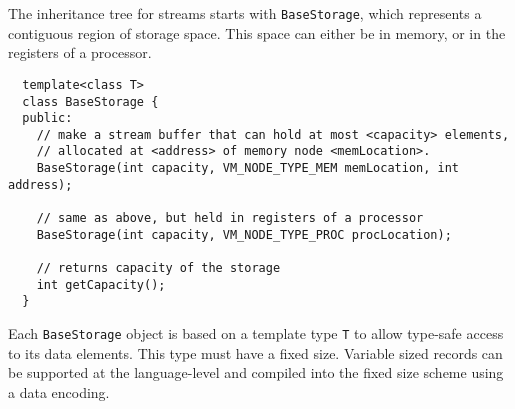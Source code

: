 

The inheritance tree for streams starts with {\tt BaseStorage}, which
represents a contiguous region of storage space.  This space can
either be in memory, or in the registers of a processor.  {\small
\begin{verbatim}
  template<class T>
  class BaseStorage {
  public:
    // make a stream buffer that can hold at most <capacity> elements,
    // allocated at <address> of memory node <memLocation>.
    BaseStorage(int capacity, VM_NODE_TYPE_MEM memLocation, int address);

    // same as above, but held in registers of a processor
    BaseStorage(int capacity, VM_NODE_TYPE_PROC procLocation);

    // returns capacity of the storage
    int getCapacity();
  }
\end{verbatim}}

Each {\tt BaseStorage} object is based on a template type {\tt T} to
allow type-safe access to its data elements.  This type must have a
fixed size.  Variable sized records can be supported at the
language-level and compiled into the fixed size scheme using a data
encoding.


\clearpage


